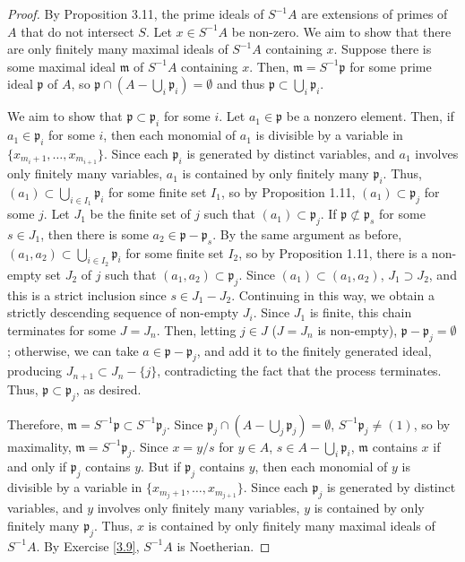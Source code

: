 \begin{proof}
By Proposition 3.11, the prime ideals of $S^{-1}A$ are extensions of primes of $A$ that do not intersect $S$. Let $x \in S^{-1}A$ be non-zero.
We aim to show that there are only finitely many maximal ideals of $S^{-1}A$ containing $x$. Suppose there is some maximal ideal $\mathfrak{m}$ of 
$S^{-1}A$ containing $x$. Then, $\mathfrak{m} = S^{-1}\mathfrak{p}$ for some prime ideal $\mathfrak{p}$ of $A$, so 
$\mathfrak{p} \cap (A - \bigcup_i \mathfrak{p}_i) = \emptyset$ and thus $\mathfrak{p} \subset \bigcup_i \mathfrak{p}_i$.

We aim to show that $\mathfrak{p} \subset \mathfrak{p}_i$ for some $i$. Let $a_1 \in \mathfrak{p}$ be a nonzero element. Then, if $a_1 \in \mathfrak{p}_i$ for 
some $i$, then each monomial of $a_1$ is divisible by a variable in $\{x_{m_i + 1},\ldots,x_{m_{i+1}}\}$. Since each $\mathfrak{p}_i$ is generated by distinct variables, 
and $a_1$ involves only finitely many variables, $a_1$ is contained by only finitely many $\mathfrak{p}_i$. Thus, $(a_1) \subset \bigcup_{i \in I_1} \mathfrak{p}_i$ for 
some finite set $I_1$, 
so by Proposition 1.11, $(a_1) \subset \mathfrak{p}_j$ for some $j$. Let $J_1$ be the finite set of $j$ such that $(a_1) \subset \mathfrak{p}_j$. If 
$\mathfrak{p} \not\subset \mathfrak{p}_s$ for some $s \in J_1$, then there is some $a_2 \in \mathfrak{p} - \mathfrak{p}_s$. By the same argument as before, 
$(a_1, a_2) \subset \bigcup_{i \in I_2} \mathfrak{p}_i$ for some finite set $I_2$, so by Proposition 1.11, there is a non-empty set $J_2$ of $j$ such
that $(a_1, a_2) \subset \mathfrak{p}_j$. Since $(a_1) \subset (a_1, a_2)$, $J_1 \supset J_2$, and this is a strict inclusion since $s \in J_1 - J_2$.
Continuing in this way, we obtain a strictly descending sequence of non-empty $J_i$. Since $J_1$ is finite, this chain terminates for some $J = J_n$. Then,
letting $j \in J$ ($J = J_n$ is non-empty), $\mathfrak{p} - \mathfrak{p}_j = \emptyset$; otherwise, we can take $a \in \mathfrak{p} - \mathfrak{p}_j$, and
add it to the finitely generated ideal, producing $J_{n+1} \subset J_n - \{j\}$, contradicting the fact that the process terminates. Thus, 
$\mathfrak{p} \subset \mathfrak{p}_j$, as desired.

Therefore, $\mathfrak{m} = S^{-1}\mathfrak{p} \subset S^{-1}\mathfrak{p}_j$. Since $\mathfrak{p}_j \cap \left(A - \bigcup_j \mathfrak{p}_j\right) = \emptyset$,
$S^{-1}\mathfrak{p}_j \neq (1)$, so by maximality, $\mathfrak{m} = S^{-1}\mathfrak{p}_j$. Since $x = y/s$ for $y \in A$, $s \in A - \bigcup_i \mathfrak{p}_i$,
$\mathfrak{m}$ contains $x$ if and only if $\mathfrak{p}_j$ contains $y$. But if $\mathfrak{p}_j$ contains $y$, then each monomial of $y$ is divisible by a variable 
in $\{x_{m_j + 1},\ldots,x_{m_{j+1}}\}$. Since each $\mathfrak{p}_j$ is generated by distinct variables, and $y$ involves only finitely many variables, $y$ is contained 
by only finitely many $\mathfrak{p}_j$. Thus, $x$ is contained by only finitely many maximal ideals of $S^{-1}A$. By Exercise \ref{3.9}, $S^{-1}A$ is Noetherian.
\end{proof}

